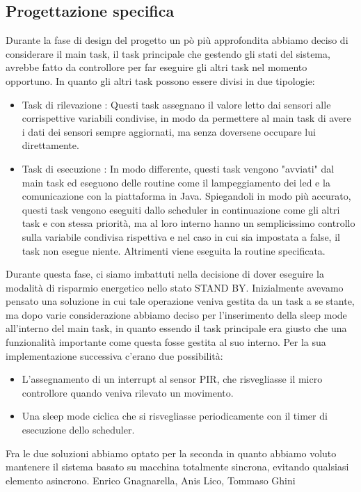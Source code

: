 \documentclass[a4paper]{article}
\begin{document}
\subsection*{Progettazione specifica}
Durante la fase di design del progetto un pò più approfondita abbiamo deciso di considerare il main task,  il task principale che gestendo gli stati del sistema, avrebbe fatto da controllore per far eseguire gli altri task nel momento opportuno. In quanto gli altri task possono essere divisi in due tipologie:
\begin{itemize}
\item {Task di rilevazione }:
Questi task assegnano il valore letto dai sensori alle corrispettive variabili condivise, in modo da permettere al main task di avere i dati dei sensori sempre aggiornati, ma senza doversene occupare lui direttamente.


\item {Task di esecuzione }:
In modo differente, questi task vengono "avviati" dal main task ed eseguono delle routine come il lampeggiamento dei led e la comunicazione con la piattaforma in Java.
Spiegandoli in modo più accurato, questi task vengono eseguiti dallo scheduler in continuazione come gli altri task e con stessa priorità, ma al loro interno hanno un semplicissimo controllo sulla variabile condivisa rispettiva e nel caso in cui sia impostata a false, il task non esegue niente. Altrimenti viene eseguita la routine specificata.

\end{itemize}
Durante questa fase, ci siamo imbattuti nella decisione di dover eseguire la modalità di risparmio energetico nello stato STAND BY. Inizialmente avevamo pensato una soluzione in cui tale operazione veniva gestita da un task a se stante, ma dopo varie considerazione abbiamo deciso per l'inserimento della sleep mode all'interno del main task, in quanto essendo il task principale era giusto che una funzionalità importante come questa fosse gestita al suo interno. 
Per la sua implementazione successiva c'erano due possibilità:
\begin{itemize}

\item {} L'assegnamento di un interrupt al sensor PIR, che risvegliasse il micro controllore quando veniva rilevato un movimento. 
\item{} Una sleep mode ciclica che si risvegliasse periodicamente con il timer di esecuzione dello scheduler.
\end{itemize}
Fra le due soluzioni abbiamo optato per la seconda in quanto abbiamo voluto mantenere il sistema basato su macchina totalmente sincrona, evitando qualsiasi elemento asincrono.
\null
\vfill
Enrico Gnagnarella, Anis Lico, Tommaso Ghini
\clearpage
\end{document}
